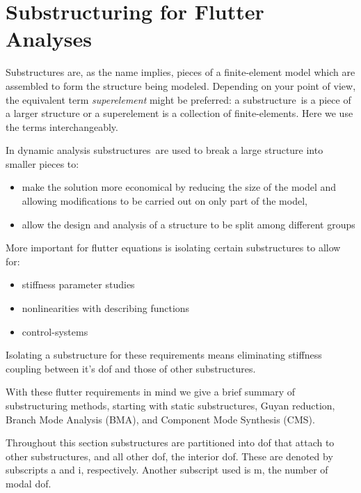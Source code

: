 \documentclass[11pt,openany,twoside]{book}
\numberwithin{equation}{section}		%
\newcommand{\Newterm}[1]{{\em #1}}
\newcommand{\Ss}{substructure}
\newcommand{\Sss}{substructures}
\begin{document}
\newpage

\section{Substructuring for Flutter Analyses}\label{sect:ss-intro}
Substructures are, as the name implies, pieces of a finite-element
model which are assembled to form the structure being modeled.
Depending on your point of view, the equivalent term
\Newterm{superelement} might be preferred:
a \Ss\ is a piece of a larger structure or
a superelement is a collection of finite-elements.
Here we use the terms interchangeably.

In dynamic analysis
\Sss\ are used to break a large structure into smaller pieces to:
\begin{itemize}
\item make the solution more economical by reducing the size of the model
	and allowing modifications to be carried out on only part of the model,
\item allow the design and analysis of a structure to be split
	among different groups
\end{itemize}
More important for flutter equations is isolating certain substructures to allow for:
\begin{itemize}
\item stiffness parameter studies
\item nonlinearities with describing functions
\item control-systems
\end{itemize}
Isolating a substructure for these requirements means eliminating stiffness
coupling between it's dof and those of other substructures.

With these flutter requirements in mind we
give a brief summary of substructuring methods, starting with static
substructures, Guyan reduction, Branch Mode Analysis (BMA), and Component Mode
Synthesis (CMS).

Throughout this section substructures are partitioned into dof that attach
to other substructures, and all other dof, the interior dof. These are denoted
by subscripts a and i, respectively. Another subscript used is m, the number of
modal dof.
\end{document}

